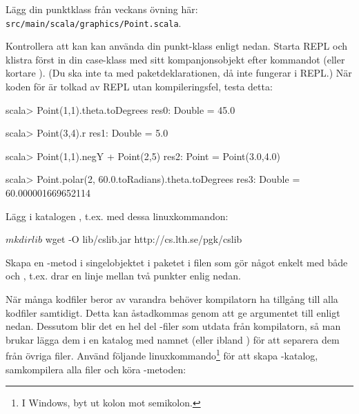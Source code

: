 \Task Lägg din punktklass från veckans övning här:\\ \texttt{src/main/scala/graphics/Point.scala}.

Kontrollera att kan kan använda din punkt-klass enligt nedan. Starta REPL och klistra först in din case-klass med sitt kompanjonsobjekt efter kommandot  (eller kortare ). (Du ska inte ta med paketdeklarationen, då  inte fungerar i REPL.) När koden för  är tolkad av REPL utan kompileringsfel, testa detta:
\begin{REPLnonum}
scala> Point(1,1).theta.toDegrees
res0: Double = 45.0

scala> Point(3,4).r
res1: Double = 5.0

scala> Point(1,1).negY + Point(2,5)
res2: Point = Point(3.0,4.0)

scala> Point.polar(2, 60.0.toRadians).theta.toDegrees
res3: Double = 60.000001669652114
\end{REPLnonum}


\Task Lägg  i katalogen , t.ex. med dessa linuxkommandon:
\begin{REPLnonum}
$ mkdir lib
$ wget -O lib/cslib.jar http://cs.lth.se/pgk/cslib
\end{REPLnonum}

\Task Skapa en -metod i singelobjektet  i paketet  i filen  som gör något enkelt med både  och , t.ex. drar en linje mellan två punkter enlig nedan.

\noindent När många kodfiler beror av varandra behöver kompilatorn ha tillgång till alla kodfiler samtidigt.  Detta kan åstadkommas genom att ge argumentet  till  enligt nedan. Dessutom blir det en hel del -filer som utdata från kompilatorn, så man brukar lägga dem i en katalog med namnet  (eller ibland ) för att separera dem från övriga filer. Använd följande linuxkommando\footnote{I Windows, byt ut kolon mot semikolon.} för att skapa -katalog, samkompilera alla filer och köra -metoden:


